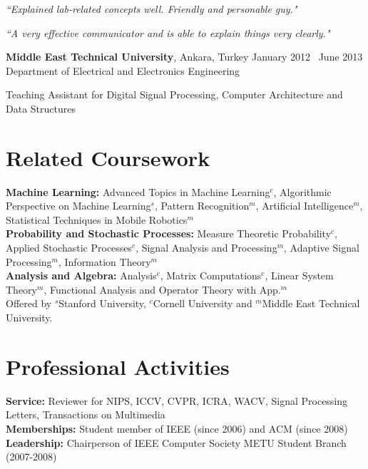 \documentclass[margin,line,10pt]{resume}
\newcommand{\metu}{\hspace{0.6mm}$^{m}$}
\newcommand{\cornell}{\hspace{0.6mm}$^{c}$}
\newcommand{\stanford}{\hspace{0.6mm}$^{s}$}
\begin{document}
\begin{resume}
\emph{``Explained lab-related concepts well. Friendly and personable guy."}

\emph{``A very effective
communicator and is able to explain things very clearly."}

\textbf{Middle East Technical University}, Ankara, Turkey \hfill January 2012 \textendash ~June 2013 \vspace{0mm}\\\vspace{0mm}%
Department of Electrical and Electronics Engineering \hfill \vspace{-7mm}\\\vspace{0mm}

Teaching Assistant for Digital Signal Processing, Computer Architecture and Data Structures \hfill \vspace{0mm}\\\vspace{0mm}
\vspace{-4mm}
\fi

\section{\mysidestyle \textcolor{olgray}{Related Coursework}}
\hspace{0mm}\textbf{Machine Learning:} Advanced Topics in Machine Learning\cornell, Algorithmic Perspective on Machine Learning\stanford,  Pattern Recognition\metu, Artificial Intelligence\metu, Statistical Techniques in Mobile Robotics\metu \vspace{0mm}\\\vspace{0mm}
\hspace{-1mm}\textbf{Probability and Stochastic Processes:} Measure Theoretic Probability\cornell, Applied Stochastic Processes\cornell,  Signal Analysis and Processing\metu, Adaptive Signal Processing\metu, Information Theory\metu \\
\textbf{Analysis and Algebra:} Analysis\cornell, Matrix Computations\cornell , Linear System Theory\metu, Functional Analysis and Operator Theory with App.\metu\\\vspace{0mm}
\hspace{-1.5mm} Offered by \stanford Stanford University, \cornell Cornell University and \metu Middle East Technical University.



\section{\mysidestyle \textcolor{olgray}{Professional Activities}}
  \textbf{Service:} Reviewer for NIPS, ICCV, CVPR, ICRA, WACV, Signal Processing Letters, Transactions on Multimedia \\
\textbf{Memberships:} Student member of IEEE (since 2006) and ACM (since 2008) \\
\textbf{Leadership:} Chairperson of IEEE Computer Society METU Student Branch (2007-2008)


\end{resume}
\end{document}
